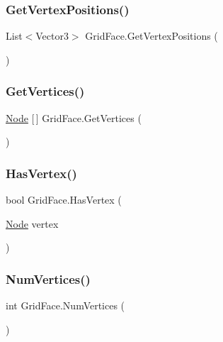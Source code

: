 \mbox{\label{class_grid_face_af4dabd4122b97fca940b763ca0000100}} 
\subsubsection{\texorpdfstring{Get\+Vertex\+Positions()}{GetVertexPositions()}}
{\footnotesize\ttfamily List$<$Vector3$>$ Grid\+Face.\+Get\+Vertex\+Positions (\begin{DoxyParamCaption}{ }\end{DoxyParamCaption})}

\mbox{\label{class_grid_face_a60aa8f74afb2447bf1921385581c8972}} 
\subsubsection{\texorpdfstring{Get\+Vertices()}{GetVertices()}}
{\footnotesize\ttfamily \mbox{\hyperlink{class_node}{Node}} \mbox{[}$\,$\mbox{]} Grid\+Face.\+Get\+Vertices (\begin{DoxyParamCaption}{ }\end{DoxyParamCaption})}

\mbox{\label{class_grid_face_ad038c4fab1850cb71cdb8b4a0c2f52f2}} 
\subsubsection{\texorpdfstring{Has\+Vertex()}{HasVertex()}}
{\footnotesize\ttfamily bool Grid\+Face.\+Has\+Vertex (\begin{DoxyParamCaption}\item[{\mbox{\hyperlink{class_node}{Node}}}]{vertex }\end{DoxyParamCaption})}

\mbox{\label{class_grid_face_a31c9530fd0dca84658fde5ddfc369fc5}} 
\subsubsection{\texorpdfstring{Num\+Vertices()}{NumVertices()}}
{\footnotesize\ttfamily int Grid\+Face.\+Num\+Vertices (\begin{DoxyParamCaption}{ }\end{DoxyParamCaption})}

